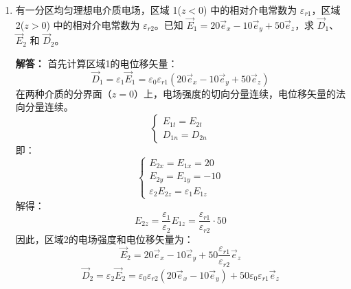\begin{enumerate}[label=\arabic*.]
求点 \((1,1,1)\) 处电场强度 \(\vec{E}\)。

\textbf{解答：}
点电荷电场
\[
\vec{E}_i=\frac{q_i}{4\pi\varepsilon_0 r_i^3}\vec{r}_i
\]

\begin{enumerate}[leftmargin=*]
    \item \(q_1\)：\(\vec{r}_1=(0,1,1),\ r_1=\sqrt{2}\)
    \[
    \vec{E}_1=\frac{1}{4\pi\varepsilon_0}\cdot \frac{1}{2\sqrt{2}}\left(\vec{e}_y+\vec{e}_z\right)
    \]

    \item \(q_2\)：\(\vec{r}_2=(1,0,1),\ r_2=\sqrt{2}\)
    \[
    \vec{E}_2=\frac{1}{4\pi\varepsilon_0}\cdot \frac{1}{2\sqrt{2}}\left(\vec{e}_x+\vec{e}_z\right)
    \]

    \item \(q_3\)：\(\vec{r}_3=(2,1,1),\ r_3=\sqrt{6}\)
    \[
    \vec{E}_3=\frac{4}{4\pi\varepsilon_0}\cdot \frac{1}{6\sqrt{6}}\left(2\vec{e}_x+\vec{e}_y+\vec{e}_z\right)
    \]
\end{enumerate}

叠加后
\[
\vec{E}=\frac{1}{4\pi\varepsilon_0}\left[
\left(\frac{1}{2\sqrt{2}}+\frac{8}{6\sqrt{6}}\right)\vec{e}_x
+\left(\frac{1}{2\sqrt{2}}+\frac{4}{6\sqrt{6}}\right)\vec{e}_y
+\left(\frac{1}{\sqrt{2}}+\frac{4}{6\sqrt{6}}\right)\vec{e}_z
\right]
\]

\vspace{1em}

\item 有一分区均匀理想电介质电场，区域 1(\(z<0\)) 中的相对介电常数为 \(\varepsilon_{r1}\)，区域 2(\(z>0\)) 中的相对介电常数为 \(\varepsilon_{r2}\)。已知 \(\vec{E}_1 = 20\vec{e}_x - 10\vec{e}_y + 50\vec{e}_z\)，求 \(\vec{D}_1\)、\(\vec{E}_2\) 和 \(\vec{D}_2\)。

\textbf{解答：}
首先计算区域1的电位移矢量：
\[
\vec{D}_1 = \varepsilon_1\vec{E}_1 = \varepsilon_0\varepsilon_{r1}(20\vec{e}_x - 10\vec{e}_y + 50\vec{e}_z)
\]
在两种介质的分界面（\(z=0\)）上，电场强度的切向分量连续，电位移矢量的法向分量连续。
\[
\begin{cases}
E_{1t} = E_{2t} \\
D_{1n} = D_{2n}
\end{cases}
\]
即：
\[
\begin{cases}
E_{2x} = E_{1x} = 20 \\
E_{2y} = E_{1y} = -10 \\
\varepsilon_2 E_{2z} = \varepsilon_1 E_{1z}
\end{cases}
\]
解得：
\[
E_{2z} = \frac{\varepsilon_1}{\varepsilon_2}E_{1z} = \frac{\varepsilon_{r1}}{\varepsilon_{r2}} \cdot 50
\]
因此，区域2的电场强度和电位移矢量为：
\[
\vec{E}_2 = 20\vec{e}_x - 10\vec{e}_y + 50\frac{\varepsilon_{r1}}{\varepsilon_{r2}}\vec{e}_z
\]
\[
\vec{D}_2 = \varepsilon_2\vec{E}_2 = \varepsilon_0\varepsilon_{r2}(20\vec{e}_x - 10\vec{e}_y) + 50\varepsilon_0\varepsilon_{r1}\vec{e}_z
\]


\end{enumerate}
